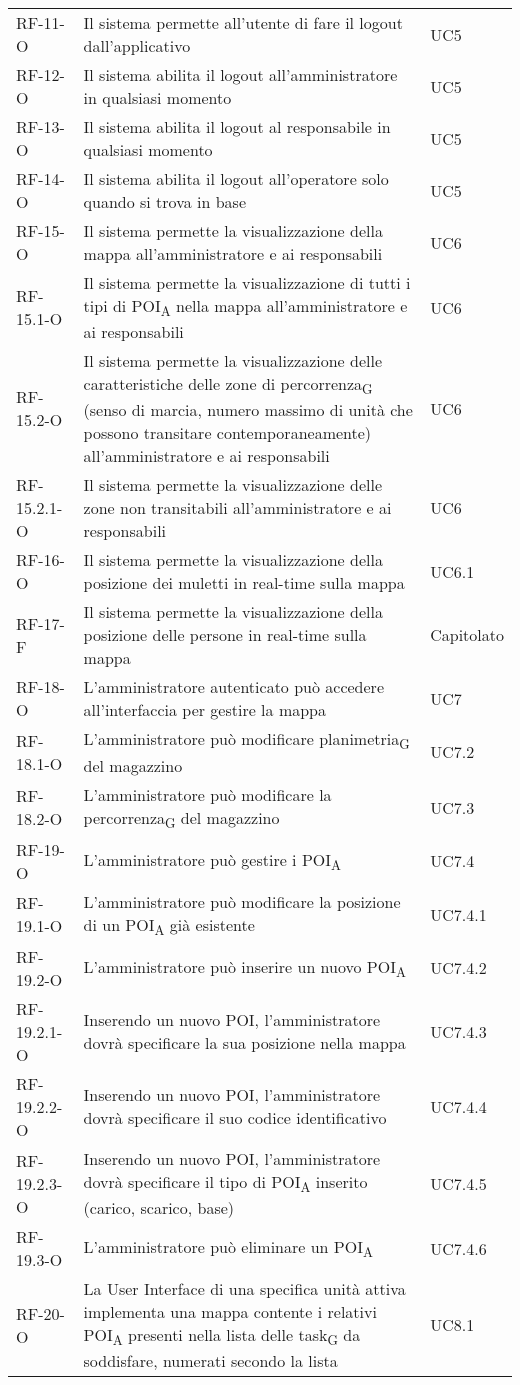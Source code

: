 \begin{longtable}{ 
		>{}p{} 
		>{}p{}
		>{\centering}p{} }
RF-11-O & Il sistema permette all'utente di fare il logout dall'applicativo & UC5\tabularnewline
RF-12-O & Il sistema abilita il logout all'amministratore in qualsiasi momento & UC5\tabularnewline
RF-13-O & Il sistema abilita il logout al responsabile in qualsiasi momento & UC5\tabularnewline
RF-14-O & Il sistema abilita il logout all'operatore solo quando si trova in base & UC5\tabularnewline
RF-15-O & Il sistema permette la visualizzazione della mappa all’amministratore e ai responsabili & UC6\tabularnewline
RF-15.1-O & Il sistema permette la visualizzazione di tutti i tipi di \acrshort{POI}\textsubscript{A} nella mappa all’amministratore e ai responsabili & UC6\tabularnewline
RF-15.2-O & Il sistema permette la visualizzazione delle caratteristiche delle zone di \gls{percorrenza}\textsubscript{G} (senso di marcia, numero massimo di unità che possono transitare contemporaneamente) all’amministratore e ai responsabili & UC6\tabularnewline
RF-15.2.1-O & Il sistema permette la visualizzazione delle zone non transitabili all’amministratore e ai responsabili & UC6\tabularnewline
RF-16-O & Il sistema permette la visualizzazione della posizione dei muletti in real-time sulla mappa & UC6.1\tabularnewline
RF-17-F & Il sistema permette la visualizzazione della posizione delle persone in real-time sulla mappa & Capitolato\tabularnewline
RF-18-O & L’amministratore autenticato può accedere all’interfaccia per gestire la mappa  & UC7\tabularnewline
RF-18.1-O & L’amministratore può modificare \gls{planimetria}\textsubscript{G} del magazzino & UC7.2\tabularnewline
RF-18.2-O & L’amministratore può modificare la \gls{percorrenza}\textsubscript{G} del magazzino & UC7.3\tabularnewline
RF-19-O & L’amministratore può gestire i \acrshort{POI}\textsubscript{A} & UC7.4\tabularnewline
RF-19.1-O & L'amministratore può modificare la posizione di un \acrshort{POI}\textsubscript{A} già esistente & UC7.4.1\tabularnewline
RF-19.2-O & L'amministratore può inserire un nuovo \acrshort{POI}\textsubscript{A} & UC7.4.2\tabularnewline
RF-19.2.1-O & Inserendo un nuovo POI, l'amministratore dovrà specificare la sua posizione nella mappa & UC7.4.3\tabularnewline
RF-19.2.2-O & Inserendo un nuovo POI, l'amministratore dovrà specificare il suo codice identificativo & UC7.4.4\tabularnewline
RF-19.2.3-O & Inserendo un nuovo POI, l'amministratore dovrà specificare il tipo di \acrshort{POI}\textsubscript{A} inserito (carico, scarico, base) & UC7.4.5\tabularnewline
RF-19.3-O & L'amministratore può eliminare un \acrshort{POI}\textsubscript{A} & UC7.4.6\tabularnewline
RF-20-O & La User Interface di una specifica unità attiva implementa una mappa contente i relativi \acrshort{POI}\textsubscript{A} presenti nella lista delle \gls{task}\textsubscript{G} da soddisfare, numerati secondo la lista & UC8.1\tabularnewline

\end{longtable}
